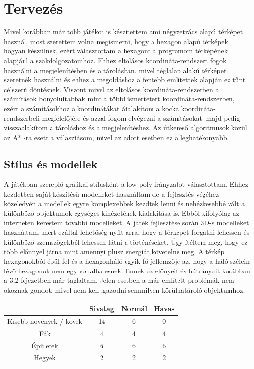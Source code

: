\chapter{Tervezés}

Mivel korábban már több játékot is készítettem ami négyzetrács alapú térképet használ, most szerettem volna megismerni, hogy a hexagon alapú térképek, hogyan készülnek, ezért választottam a hexagont a programom térképének alapjául a szakdolgozatomhoz. Ehhez eltolásos koordináta-rendszert fogok használni a megjelenítésben és a tárolásban, mivel téglalap alakú térképet szeretnék használni és ehhez a megoldáshoz a fentebb említettek alapján ez tűnt célszerű döntésnek. Viszont mivel az eltolásos koordináta-rendszerben a számítások bonyolultabbak mint a többi ismertetett koordináta-rendszerben, ezért a számításokhoz a koordinátákat átalakítom a kocka koordináta-rendszerbeli megfelelőjére és azzal fogom elvégezni a számításokat, majd pedig visszaalakítom a tároláshoz és a megjelenítéshez. Az útkereső algoritmusok közül az A* -ra esett a választásom, mivel az adott esetben ez a leghatékonyabb.

\section{Stílus és modellek}

A játékban szereplő grafikai stílusként a low-poly irányzatot választottam. Ehhez kezdetben saját készítésű modelleket használtam de a fejlesztés végéhez közeledvén a modellek egyre komplexebbek kezdtek lenni és nehézkesebbé vált a különböző objektumok egységes kinézetének kialakítása is. Ebből kifolyólag az interneten kerestem további modelleket.
\newline
\newline A játék fejlesztése során 3D-s modelleket használtam, mert ezáltal lehetőség nyílt arra, hogy a térképet forgatni lehessen és különböző szemszögekből lehessen látni a történéseket. Úgy ítéltem meg, hogy ez több előnnyel járna mint amennyi plusz energiát követelne meg.
\newline
\newline A térkép hexagonokból épül fel és a hexagonháló egyik fő jellemzője az, hogy a háló szélein lévő hexagonok nem egy vonalba esnek. Ennek az előnyeit és hátrányait korábban a 3.2 fejezetben már taglaltam. Jelen esetben a már említett problémák nem okoznak gondot, mivel nem kell igazodni semmilyen körülhatároló objektumhoz.

\begin{center}
  \begin{tabular}{ | c | c | c | c | }
    \hline
     & Sivatag & Normál & Havas \\ \hline
    Kisebb növények / kövek & 14 & 6 & 0 \\ \hline
    Fák & 4 & 4 & 4 \\ \hline
    Épületek & 6 & 6 & 6 \\ \hline
    Hegyek & 2 & 2 & 2 \\ \hline
  \end{tabular}
\end{center}

